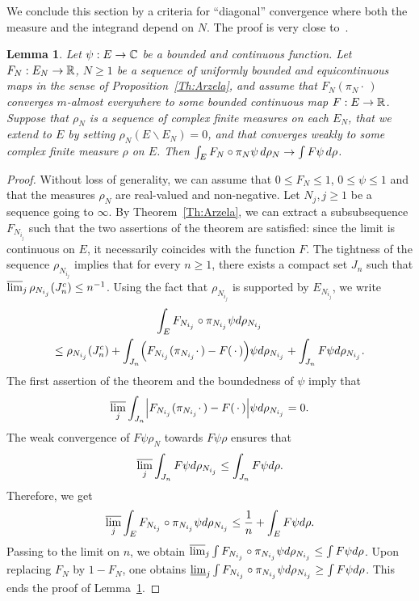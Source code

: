 \documentclass[10pt]{amsart}
\newtheorem{lemm}[theo]{Lemma}\newtheorem{prop}[theo]{Proposition}\newtheorem{coro}[theo]{Corollary}\newtheorem{conj}[theo]{Conjecture}
\theoremstyle{definition}\newtheorem{defi}[theo]{Definition}\newtheorem{rema}[theo]{Remark}\newtheorem{exam}[theo]{Example}\newtheorem{exem}[theo]{Example}\newtheorem{nota}[theo]{Notation}
\theoremstyle{plain}
\newcommand{\bbC}{\mathbb{C}}
\newcommand{\R}{\mathbb{R}}
\let\originalleft\left
\let\originalright\right
\renewcommand{\left}{\mathopen{}\mathclose\bgroup\originalleft}
\renewcommand{\right}{\aftergroup\egroup\originalright}
\renewcommand*{\to}{\mathchoice{\longrightarrow}{\rightarrow}{\rightarrow}{\rightarrow}}
\begin{document}
We conclude this section by a criteria for ``diagonal'' convergence where both the measure and the integrand depend on $N$. The proof is very close to~\cite[Lemma~1]{Zambotti2001}.

\begin{lemm}\label{Lemma:EquiContCV}
Let $\psi:E\to \bbC$ be a bounded and continuous function. Let $F_N:E_N\to \R$, $N\geq 1$ be a sequence of uniformly bounded and equicontinuous maps in the sense of Proposition~\ref{Th:Arzela}, and assume that $F_N(\pi_N\cdot\,)$ converges $m$-almost everywhere to some bounded continuous map $F:E\to\R$. Suppose that $\rho_N$ is a sequence of complex finite measures on each $E_N$, that we extend to $E$ by setting $\rho_N(E\backslash E_N) = 0$, and that converges weakly to some complex finite measure $\rho$ on $E$. Then $\int_E F_N\circ \pi_N \psi \,d\rho_N \to \int F \psi \,d\rho$.
\end{lemm}
\begin{proof}
Without loss of generality, we can assume that $0\leq F_N \leq 1$, $0\leq \psi \leq 1$ and that the measures $\rho_N$ are real-valued and non-negative. Let ${N}_j,j\geq 1$ be a sequence going to $\infty$. By Theorem~\ref{Th:Arzela}, we can extract a subsubsequence $F_{N_{i_j}}$ such that the two assertions of the theorem are satisfied: since the limit is continuous on $E$, it necessarily coincides with the function $F$. The tightness of the sequence $\rho_{N_{i_j}}$ implies that for every $n\geq 1$, there exists a compact set $J_n$ such that $\varlimsup_j \rho_{N_{i_j}}(J_n^c) \leq n^{-1}$. Using the fact that $\rho_{N_{i_j}}$ is supported by $E_{N_{i_j}}$, we write
\begin{multline}
\int_E F_{N_{i_j}}\circ \pi_{N_{i_j}} \psi d\rho_{N_{i_j}} \\
\leq \rho_{N_{i_j}}\left(J_n^c\right) + \int_{J_n} \left(F_{N_{i_j}}(\pi_{N_{i_j}}\cdot\,)-F(\,\cdot\,)\right) \psi d\rho_{N_{i_j}} + \int_{J_n} F \psi d\rho_{N_{i_j}}.
\end{multline}
The first assertion of the theorem and the boundedness of $\psi$ imply that
\[
\varlimsup_{j}\int_{J_n} \left|F_{N_{i_j}}(\pi_{N_{i_j}}\cdot\,)-F(\,\cdot\,)\right| \psi d\rho_{N_{i_j}} = 0.
\]
The weak convergence of $F\psi\rho_N$ towards $F\psi\rho$ ensures that
\[
\varlimsup_{j} \int_{J_n} F \psi d\rho_{N_{i_j}} \leq \int_{J_n} F \psi d\rho.
\]
Therefore, we get
\begin{equation}
\varlimsup_{j} \int_E F_{N_{i_j}}\circ \pi_{N_{i_j}} \psi d\rho_{N_{i_j}} \leq \frac{1}{n} + \int_E F \psi d\rho.
\end{equation}
Passing to the limit on $n$, we obtain $\varlimsup_{j} \int F_{N_{i_j}}\circ \pi_{N_{i_j}} \psi d\rho_{N_{i_j}} \leq \int F \psi d\rho$. Upon replacing $F_N$ by $1-F_N$, one obtains $\varliminf_{j} \int F_{N_{i_j}}\circ \pi_{N_{i_j}} \psi d\rho_{N_{i_j}} \geq \int F \psi d\rho$. This ends the proof of Lemma~\ref{Lemma:EquiContCV}.
\end{proof}
\end{document}
